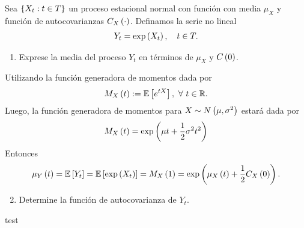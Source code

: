 \documentclass[../main.tex]{subfiles}
\begin{document}
    \begin{enunciado}
        Sea $\left\lbrace X_t : t \in T \right\rbrace$ un proceso estacional normal con función con media $\mu_X$ y función de autocovarianzas $C_X\left( \cdot \right)$. Definamos la serie no lineal
            \begin{align}
                \label{2:modelo}
                Y_t = \exp\left( X_t \right),\quad t \in T.
            \end{align}
        \begin{enumerate}
        	\item Exprese la media del proceso $Y_t$ en términos de $\mu_X$ y $C\left( 0 \right)$.
        \end{enumerate}

    \end{enunciado}
    \begin{demostracion}
        Utilizando la función generadora de momentos dada por
            \begin{align*}
                M_X\left( t \right) := \mathbb{E} \left[ e^{tX} \right],\ \forall\  t \in \mathbb{R}.
            \end{align*}
        Luego, la función generadora de momentos para $X \sim N\left( \mu,\sigma^2 \right)$ estará dada por
            \begin{align*}
                M_X\left( t \right) = \exp\left( \mu t + \frac 1 2 \sigma^2 t^2 \right)
            \end{align*}
        Entonces
            \begin{align*}
                \mu_Y\left( t \right) = \mathbb{E} \left[ Y_t \right] = \mathbb{E} \left[ \exp\left( X_t \right) \right] = M_X\left( 1 \right) = \exp\left( \mu_X\left( t \right) + \frac 1 2 C_X\left( 0 \right) \right).
            \end{align*}

    \end{demostracion}
    \vspace{1em}
    \begin{enunciado}
    	\begin{enumerate}
    		\setcounter{enumi}{1}
        	\item Determine la función de autocovarianza de $Y_t$.
    	\end{enumerate}
    \end{enunciado}

    \begin{demostracion}
        test
    \end{demostracion}
\end{document}

